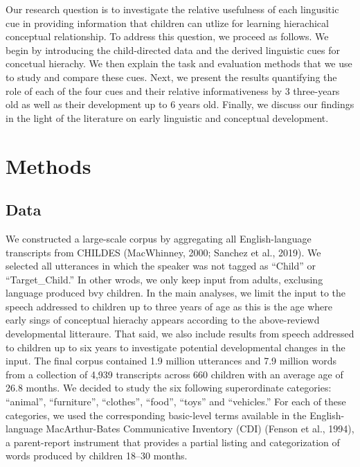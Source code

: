 \documentclass[english,,man]{apa6}
\begin{document}
Our research question is to investigate the relative usefulness of each lingusitic cue in providing information that children can utlize for learning hierachical conceptual relationship. To address this question, we proceed as follows. We begin by introducing the child-directed data and the derived linguistic cues for concetual hierachy. We then explain the task and evaluation methods that we use to study and compare these cues. Next, we present the results quantifying the role of each of the four cues and their relative informativeness by 3 three-years old as well as their development up to 6 years old. Finally, we discuss our findings in the light of the literature on early linguistic and conceptual development.

\hypertarget{methods}{%
\section{Methods}\label{methods}}

\hypertarget{data}{%
\subsection{Data}\label{data}}

We constructed a large-scale corpus by aggregating all English-language transcripts from CHILDES (MacWhinney, 2000; Sanchez et al., 2019). We selected all utterances in which the speaker was not tagged as \enquote{Child} or \enquote{Target\_Child.} In other wrods, we only keep input from adults, exclusing language produced bvy children. In the main analyses, we limit the input to the speech addressed to children up to three years of age as this is the age where early sings of conceptual hierachy appears according to the above-reviewd developmental litteraure. That said, we also include results from speech addressed to children up to six years to investigate potential developmental changes in the input. The final corpus contained 1.9 million utterances and 7.9 million words from a collection of 4,939 transcripts across 660 children with an average age of 26.8 months. We decided to study the six following superordinate categories: \enquote{animal}, \enquote{furniture}, \enquote{clothes}, \enquote{food}, \enquote{toys} and \enquote{vehicles.} For each of these categories, we used the corresponding basic-level terms available in the English-language MacArthur-Bates Communicative Inventory (CDI) (Fenson et al., 1994), a parent-report instrument that provides a partial listing and categorization of words produced by children 18--30 months.
\end{document}
